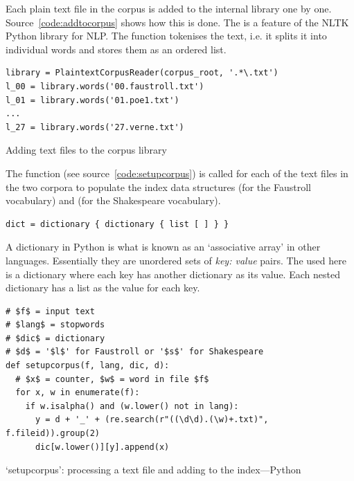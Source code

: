 Each plain text file in the corpus is added to the internal library one by one. Source~\ref{code:addtocorpus} shows how this is done. The  is a feature of the \ac{NLTK} Python library \autocite{NLTK2016} for \acf{NLP}. The  function tokenises the text, i.e. it splits it into individual words and stores them as an ordered list.

\begin{listing}[!htbp] %
  \begin{verbatim}
library = PlaintextCorpusReader(corpus_root, '.*\.txt')
l_00 = library.words('00.faustroll.txt')
l_01 = library.words('01.poe1.txt')
...
l_27 = library.words('27.verne.txt')
  \end{verbatim}
\caption{Adding text files to the corpus library}
\label{code:addtocorpus}
\end{listing}

The  function (see source~\ref{code:setupcorpus}) is called for each of the text files in the two corpora to populate the index data structures  (for the Faustroll vocabulary) and  (for the Shakespeare vocabulary).

\begin{verbatim}
dict = dictionary { dictionary { list [ ] } }
\end{verbatim}

A dictionary in Python is what is known as an `associative array' in other languages. Essentially they are unordered sets of \emph{key: value} pairs. The  used here is a dictionary where each key has another dictionary as its value. Each nested dictionary has a list as the value for each key.

\begin{listing}[!htbp] %
  \begin{verbatim}
# $f$ = input text
# $lang$ = stopwords
# $dic$ = dictionary
# $d$ = '$l$' for Faustroll or '$s$' for Shakespeare
def setupcorpus(f, lang, dic, d):
  # $x$ = counter, $w$ = word in file $f$
  for x, w in enumerate(f):
    if w.isalpha() and (w.lower() not in lang):
      y = d + '_' + (re.search(r"((\d\d).(\w)+.txt)", f.fileid)).group(2)
      dic[w.lower()][y].append(x)
  \end{verbatim}
\caption[`setupcorpus' function---Python]{`setupcorpus': processing a text file and adding to the index---Python}
\label{code:setupcorpus}
\end{listing}

